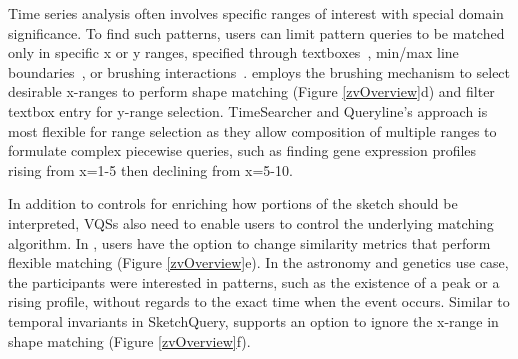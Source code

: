 \par Time series analysis often involves specific ranges of interest with special domain significance. To find such patterns, users can limit pattern queries to be matched only in specific x or y ranges, specified through textboxes~\cite{wattenberg2001sketching,Mannino2018}, min/max line boundaries~\cite{ryall2005querylines}, or brushing interactions~\cite{Hochheiser2001}. \zv employs the brushing mechanism to select desirable x-ranges to perform shape matching (Figure \ref{zvOverview}d) and filter textbox entry for y-range selection. %
TimeSearcher and Queryline's approach is most flexible for range selection as they allow composition of multiple ranges to formulate complex piecewise queries, such as finding gene expression profiles rising from x=1-5 then declining from x=5-10.
\par In addition to controls for enriching how portions of the sketch should be interpreted, VQSs also need to enable users to control the underlying matching algorithm. In \zv, users have the option to change similarity metrics that perform flexible matching (Figure \ref{zvOverview}e). In the astronomy and genetics use case, the participants were interested in patterns, such as the existence of a peak or a rising profile, without regards to the exact time when the event occurs. Similar to temporal invariants in SketchQuery, \zv supports an option to ignore the x-range in shape matching (Figure \ref{zvOverview}f). %

